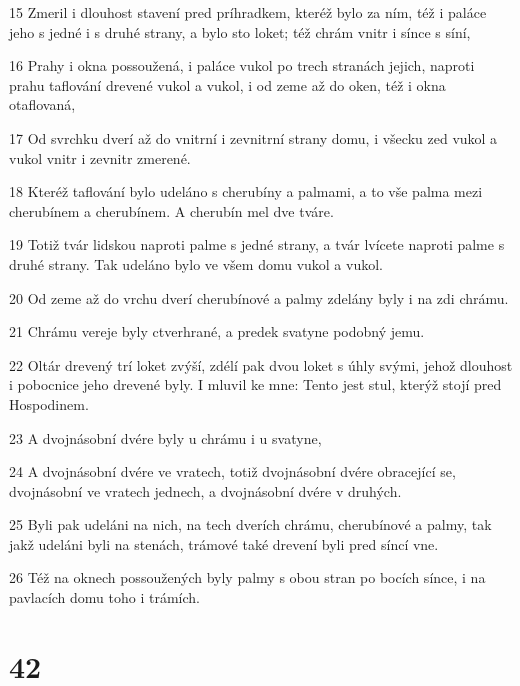 \par 15 Zmeril i dlouhost stavení pred príhradkem, kteréž bylo za ním, též i paláce jeho s jedné i s druhé strany, a bylo sto loket; též chrám vnitr i sínce s síní,
\par 16 Prahy i okna possoužená, i paláce vukol po trech stranách jejich, naproti prahu taflování drevené vukol a vukol, i od zeme až do oken, též i okna otaflovaná,
\par 17 Od svrchku dverí až do vnitrní i zevnitrní strany domu, i všecku zed vukol a vukol vnitr i zevnitr zmerené.
\par 18 Kteréž taflování bylo udeláno s cherubíny a palmami, a to vše palma mezi cherubínem a cherubínem. A cherubín mel dve tváre.
\par 19 Totiž tvár lidskou naproti palme s jedné strany, a tvár lvícete naproti palme s druhé strany. Tak udeláno bylo ve všem domu vukol a vukol.
\par 20 Od zeme až do vrchu dverí cherubínové a palmy zdelány byly i na zdi chrámu.
\par 21 Chrámu vereje byly ctverhrané, a predek svatyne podobný jemu.
\par 22 Oltár drevený trí loket zvýší, zdélí pak dvou loket s úhly svými, jehož dlouhost i pobocnice jeho drevené byly. I mluvil ke mne: Tento jest stul, kterýž stojí pred Hospodinem.
\par 23 A dvojnásobní dvére byly u chrámu i u svatyne,
\par 24 A dvojnásobní dvére ve vratech, totiž dvojnásobní dvére obracející se, dvojnásobní ve vratech jednech, a dvojnásobní dvére v druhých.
\par 25 Byli pak udeláni na nich, na tech dverích chrámu, cherubínové a palmy, tak jakž udeláni byli na stenách, trámové také drevení byli pred síncí vne.
\par 26 Též na oknech possoužených byly palmy s obou stran po bocích sínce, i na pavlacích domu toho i trámích.

\chapter{42}

